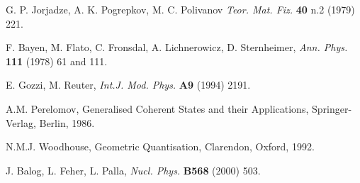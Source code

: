 \documentclass[a4paper,12pt]{article}
\begin{document}
\begin{thebibliography}{xx}
 G. P. Jorjadze, A. K. Pogrepkov, M. C. Polivanov {\it
    Teor. Mat. Fiz.} {\bf 40} n.2 (1979) 221.

 F. Bayen, M. Flato, C. Fronsdal, A. Lichnerowicz, D.
  Sternheimer, {\it Ann. Phys.} {\bf 111} (1978) 61 and 111.

 E. Gozzi, M. Reuter,
{\it  Int.J. Mod. Phys.} {\bf A9} (1994) 2191.


 A.M. Perelomov, Generalised Coherent States and
  their Applications, Springer-Verlag, Berlin, 1986.

 N.M.J. Woodhouse, Geometric Quantisation,
  Clarendon, Oxford, 1992.

 J. Balog, L. Feher, L. Palla, {\it Nucl. Phys.} {\bf
      B568} (2000) 503.

\end{thebibliography}
\end{document}

